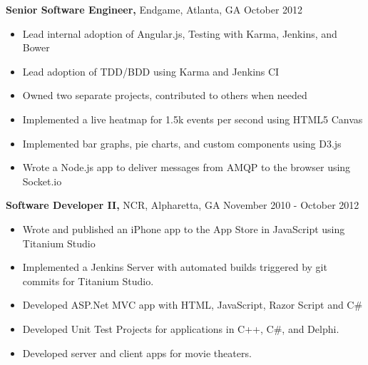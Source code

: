\documentclass[margin]{res}
\begin{document}
\begin{resume}
    {\bf Senior Software Engineer,} Endgame, Atlanta, GA \hfill October 2012
        \begin{itemize} \itemsep -2pt %
            \item Lead internal adoption of Angular.js, Testing with Karma,
                Jenkins, and Bower
            \item Lead adoption of TDD/BDD using Karma and Jenkins CI
            \item Owned two separate projects, contributed to others when
                needed
            \item Implemented a live heatmap for 1.5k events per second using HTML5 Canvas
            \item Implemented bar graphs, pie charts, and custom components using D3.js
            \item Wrote a Node.js app to deliver messages from AMQP to the browser using
                Socket.io
        \end{itemize}

    {\bf Software Developer II,} NCR, Alpharetta, GA \hfill November 2010 - October
    2012
        \begin{itemize} \itemsep -2pt
            \item Wrote and published an iPhone app to the App Store in JavaScript
                using Titanium Studio
            \item Implemented a Jenkins Server with automated builds triggered by
                git commits for Titanium Studio.
            \item Developed ASP.Net MVC app with HTML, JavaScript, Razor Script and
                C\#
            \item Developed Unit Test Projects for applications in C++, C\#, and
                Delphi.
            \item Developed server and client apps for movie theaters.
        \end{itemize}


\end{resume}
\end{document}
